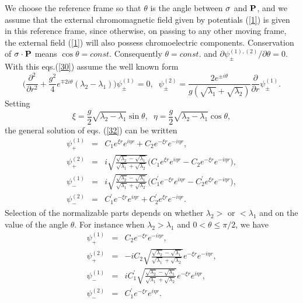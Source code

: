 \documentclass[a4paper,12pt,a4]{article}
\begin{document}
We choose the reference frame so that $\theta$ is the
angle between ${\bf \sigma} $ and ${\bf P}$, and
we assume that the external chromomagnetic field given
by potentials (\ref{1}) is given in this
reference frame, since otherwise, 
on passing to any other moving frame, the external
field (\ref{1}) will also possess chromoelectric
components.  Conservation of ${\bf \sigma}\cdot{\bf P}$
means $\cos\theta = const.$ Consequently
$\theta = const.$ and $\partial\psi^{(1),(2)}_{\pm}/\partial\theta =0$.
With this eqs.(\ref{30}) assume the well known form
\begin{equation}
\bigg(\frac{\partial^2}{\partial r^2}+\frac{g^2}{4}e^{\mp2i\theta}
(\lambda_2-\lambda_1)\bigg)\psi^{(1)}_{\pm} =0, \;\;
\psi^{(2)}_{\pm}=\frac{2e^{\pm i\theta}}{g(\sqrt{\lambda_1}+\sqrt{\lambda_2})}
\frac{\partial}{\partial r}\psi^{(1)}_{\pm}.
\label{32}
\end{equation}
Setting
$$
\xi=\frac{g}{2}\sqrt{\lambda_2-\lambda_1}\sin\theta, \;\;
\eta=\frac{g}{2}\sqrt{\lambda_2-\lambda_1}\cos\theta,
$$
the general solution of eqs. (\ref{32}) can be written
\begin{eqnarray}
\psi^{(1)}_+&=& C_1e^{\xi r}e^{i\eta r}+C_2e^{-\xi r}e^{-i\eta r},\nonumber\\
\psi^{(2)}_+&=&i\sqrt{\frac{\sqrt{\lambda_2}-\sqrt{\lambda_1}}
{\sqrt{\lambda_1}+\sqrt{\lambda_2}}}
\bigg( C_1e^{\xi r}e^{i\eta r}-C_2e^{-\xi r}e^{-i\eta r}\bigg),\nonumber\\
\psi^{(1)}_-&=&i\sqrt{\frac{\sqrt{\lambda_2}-\sqrt{\lambda_1}}
{\sqrt{\lambda_1}+\sqrt{\lambda_2}}}
\bigg( C^{\prime}_1e^{-\xi r}e^{i\eta r}
-C^{\prime}_2e^{\xi r}e^{-i\eta r}\bigg),\nonumber\\
\psi^{(2)}_-&=& C^{\prime}_1e^{-\xi r}
e^{i\eta r}+C^{\prime}_2e^{\xi r}e^{-i\eta r}.
\label{33}
\end{eqnarray}
Selection of the normalizable parts depends on
whether $\lambda_2>$ or $<\lambda_1$ and on the value of
the angle $\theta$. For instance when $\lambda_2>\lambda_1$
and $0< \theta\leq \pi/2$, we have
\begin{eqnarray}
\psi^{(1)}_+&=&C_2e^{-\xi r}e^{-i\eta r},\nonumber\\
\psi^{(2)}_+&=&-iC_2\sqrt{\frac{\sqrt{\lambda_2}-\sqrt{\lambda_1}}
{\sqrt{\lambda_1}+\sqrt{\lambda_2}}}
 e^{-\xi r}e^{-i\eta r},\nonumber\\
\psi^{(1)}_-&=&iC^{\prime}_1\sqrt{\frac{\sqrt{\lambda_2}-\sqrt{\lambda_1}}
{\sqrt{\lambda_1}+\sqrt{\lambda_2}}}
 e^{-\xi r}e^{i\eta r},\nonumber\\
\psi^{(2)}_-&=& C^{\prime}_1e^{-\xi r}
e^{i\eta r}.
\label{34}
\end{eqnarray}
\end{document}
